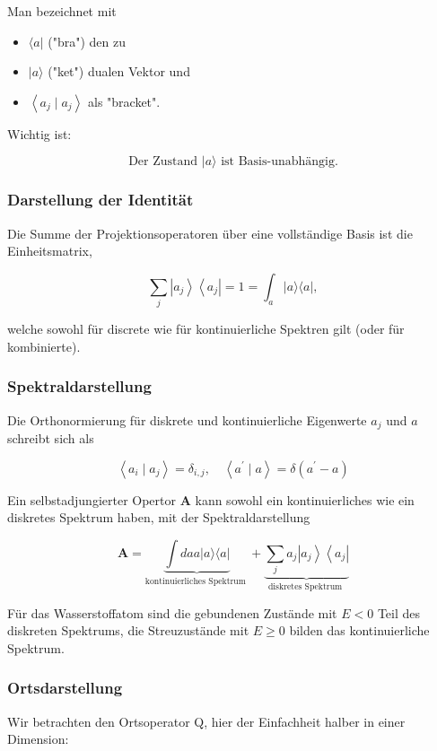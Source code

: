 \documentclass[10pt, letterpaper]{article}
\begin{document}
Man bezeichnet mit

\begin{itemize}
  \item $\langle a|$ ("bra") den zu
  \item $|a\rangle$ ("ket") dualen Vektor und
  \item $\left\langle a_{j} \mid a_{j}\right\rangle$ als "bracket".
\end{itemize}

Wichtig ist:

$$
\text { Der Zustand }|a\rangle \text { ist Basis-unabhängig. }
$$

\subsubsection*{Darstellung der Identität}
Die Summe der Projektionsoperatoren über eine vollständige Basis ist die Einheitsmatrix,

$$
\sum_{j}\left|a_{j}\right\rangle\left\langle a_{j}\right|=1=\int_{a}|a\rangle\langle a|,
$$

welche sowohl für discrete wie für kontinuierliche Spektren gilt (oder für kombinierte).

\subsubsection*{Spektraldarstellung}
Die Orthonormierung für diskrete und kontinuierliche Eigenwerte $a_{j}$ und $a$ schreibt sich als

$$
\left\langle a_{i} \mid a_{j}\right\rangle=\delta_{i, j}, \quad\left\langle a^{\prime} \mid a\right\rangle=\delta\left(a^{\prime}-a\right)
$$

Ein selbstadjungierter Opertor $\mathbf{A}$ kann sowohl ein kontinuierliches wie ein diskretes Spektrum haben, mit der Spektraldarstellung

$$
\mathbf{A}=\underbrace{\int d a a|a\rangle\langle a|}_{\text {kontinuierliches Spektrum }}+\underbrace{\sum_{j} a_{j}\left|a_{j}\right\rangle\left\langle a_{j}\right|}_{\text {diskretes Spektrum }}
$$

Für das Wasserstoffatom sind die gebundenen Zustände mit $E<0$ Teil des diskreten Spektrums, die Streuzustände mit $E \geq 0$ bilden das kontinuierliche Spektrum.

\subsubsection*{Ortsdarstellung}
Wir betrachten den Ortsoperator Q, hier der Einfachheit halber in einer Dimension:
\end{document}
